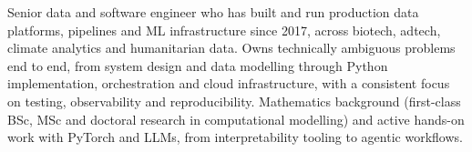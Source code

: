 

\begin{cvparagraph}

Senior data and software engineer who has built and run production data platforms, pipelines and ML infrastructure since 2017, across biotech, adtech, climate analytics and humanitarian data. Owns technically ambiguous problems end to end, from system design and data modelling through Python implementation, orchestration and cloud infrastructure, with a consistent focus on testing, observability and reproducibility. Mathematics background (first-class BSc, MSc and doctoral research in computational modelling) and active hands-on work with PyTorch and LLMs, from interpretability tooling to agentic workflows.

\end{cvparagraph}

